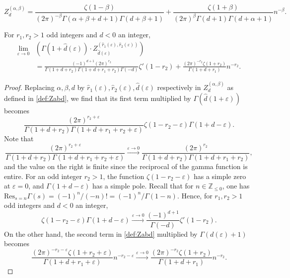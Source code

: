 \documentclass[10pt,a4paper]{amsart}
\begin{document}
\begin{equation}\label{def:Zabd}
         {Z}^{(\alpha,\beta)}_d =  \frac{ \zeta(1-\beta) }{ (2 \pi )^{-\beta}\Gamma (\alpha + \beta +d+1) \Gamma (d+\beta+1)  } +   \frac{\zeta(1+\beta)}{(2 \pi)^{\beta}\Gamma(d+1) \Gamma(d+\alpha+1)} n^{-\beta }.
\end{equation}

\begin{lemma} For $r_1,r_2>1$ odd integers and $d<0 $ an integer, 
\begin{align}
\lim_{\varepsilon\to 0}&\left(\Gamma(1+\hat d(\varepsilon)) \cdot Z^{(\hat r_1(\varepsilon),\hat r_2(\varepsilon))}_{\hat d(\varepsilon)}\right)\nonumber\\ &= 
  \frac{(-1)^{d+1} (2 \pi )^{r_2} }{\Gamma (1+d+r_2) \Gamma (1+d+r_1+r_2 ) \Gamma(-d) } \zeta'(1-r_2) + \frac{(2 \pi )^{-r_2} \zeta (1+r_2 )}{\Gamma (1+d+r_1 )} n^{-r_2}.
\end{align}
\end{lemma}

\begin{proof}
Replacing \(\alpha, \beta, d\) by \(\hat r_1(\varepsilon), \hat r_2(\varepsilon),\hat d(\varepsilon)\) respectively in $Z^{(\alpha,\beta)}_d$ as defined in \eqref{def:Zabd}, we find that its first term multiplied by \(\Gamma(\hat d(1+\varepsilon))\) becomes 
\begin{equation}
\frac{(2 \pi )^{r_2+\varepsilon} }{\Gamma (1+d+r_2) \Gamma (1+d+r_1+r_2+\varepsilon )} \zeta (1-r_2-\varepsilon ) \Gamma \left(1+d -\varepsilon\right).
\end{equation}
Note that 
\begin{equation}
  \frac{(2 \pi )^{r_2+\varepsilon} }{\Gamma (1+d+r_2) \Gamma (1+d+r_1+r_2+\varepsilon )} 
  \stackrel{\varepsilon \to 0}{\to}
  \frac{(2 \pi )^{r_2} }{\Gamma (1+d+r_2) \Gamma (1+d+r_1+r_2 )} ,
\end{equation}
and the value on the right is finite since the reciprocal of the gamma function is entire. 
For an odd integer $r_2>1$, the function $   \zeta (1-r_2-\varepsilon)$ has a simple zero at $\varepsilon = 0$, and $\Gamma \left(1+d -\varepsilon\right)$ has a simple pole. Recall that for $n\in\mathbb{Z}_{\leq 0}$, one has  $\text{Res}_{s=n}\Gamma(s) = (-1)^n/(-n)! = (-1)^n / \Gamma(1-n)$. Hence, for $r_1,r_2>1$ odd integers and $d<0 $ an integer,
\begin{equation}
   \zeta (1-r_2-\varepsilon ) \Gamma \left(1+d -\varepsilon\right)
    \stackrel{ \varepsilon \to 0  }{\to} 
    \frac{  (-1)^{d+1}  }{    \Gamma(-d)}    \zeta'(1-r_2).
\end{equation}
On the other hand, the second term in \eqref{def:Zabd} multiplied by $\Gamma(d(\varepsilon)+1)$ becomes 
\begin{equation}
\frac{(2 \pi )^{-r_2-\varepsilon } \zeta (1+r_2+\varepsilon )}{\Gamma (1+d+r_1+\varepsilon )}  n^{-r_2-\varepsilon} \stackrel{  \varepsilon \to 0   }{\to} \frac{(2 \pi )^{-r_2} \zeta (1+r_2 )}{\Gamma (1+d+r_1 )} n^{-r_2}.
\end{equation}
\end{proof}
\end{document}
